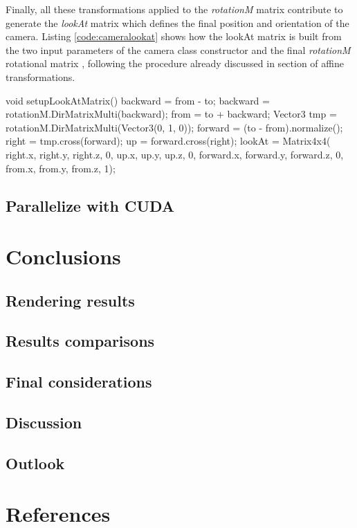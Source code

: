 \documentclass[12pt,a4paper]{extarticle}
\begin{document}
Finally, all these transformations applied to the \textit{rotationM} matrix contribute to generate the \textit{lookAt} matrix which defines the final position and orientation of the camera. Listing \ref{code:cameralookat} shows how the lookAt matrix is built from the two input parameters of the camera class constructor and the final \textit{rotationM} rotational matrix , following the procedure already discussed in section of affine transformations.

\begin{cpp}[caption={Camera class member function that build the lookAt transformation matrix, applying the final \textit{rotationM} matrix which group all the rotational transformation matrices. },label=code:cameralookat]
void setupLookAtMatrix() {
	backward = from - to;
	backward = rotationM.DirMatrixMulti(backward);
	from = to + backward;
	Vector3 tmp = rotationM.DirMatrixMulti(Vector3(0, 1, 0));
	forward = (to - from).normalize();
	right = tmp.cross(forward);
	up = forward.cross(right);
	lookAt = Matrix4x4(
		right.x, right.y, right.z, 0,
		up.x, up.y, up.z, 0,
		forward.x, forward.y, forward.z, 0,
		from.x, from.y, from.z, 1);
}
\end{cpp}

\subsection{Parallelize with CUDA} 
\section{Conclusions} 
\subsection{Rendering results} 
\subsection{Results comparisons} 
\subsection{Final considerations} 
\subsection{Discussion} 
\subsection{Outlook}
\pagebreak
\section*{References}
\nocite{*}
\printbibliography[heading=none]{}
\end{document}
